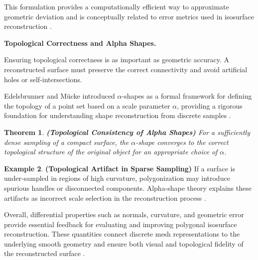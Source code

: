 \documentclass[12pt, a4paper, oneside]{book}
\theoremstyle{plain}
\newtheorem{theorem}{Theorem}[chapter]
\theoremstyle{definition}
\newtheorem{example}[theorem]{Example}
\theoremstyle{remark}
\theoremstyle{definition}
\begin{document}
This formulation provides a computationally efficient way to approximate geometric deviation and is conceptually related to error metrics used in isosurface reconstruction \cite{garland1997surface}.

\vspace{0.5em}

\textbf{Topological Correctness and Alpha Shapes.}

Ensuring topological correctness is as important as geometric accuracy. A reconstructed surface must preserve the correct connectivity and avoid artificial holes or self-intersections.

Edelsbrunner and Mücke introduced $\alpha$-shapes as a formal framework for defining the topology of a point set based on a scale parameter $\alpha$, providing a rigorous foundation for understanding shape reconstruction from discrete samples \cite{edelsbrunner1994three}.

\begin{theorem}
    \textbf{(Topological Consistency of Alpha Shapes)}
For a sufficiently dense sampling of a compact surface, the $\alpha$-shape converges to the correct topological structure of the original object for an appropriate choice of $\alpha$.
\end{theorem}

\vspace{0.5em}

\begin{example}
    \textbf{(Topological Artifact in Sparse Sampling)}
If a surface is under-sampled in regions of high curvature, polygonization may introduce spurious handles or disconnected components. Alpha-shape theory explains these artifacts as incorrect scale selection in the reconstruction process \cite{edelsbrunner1994three}.
\end{example}


\vspace{0.5em}

Overall, differential properties such as normals, curvature, and geometric error provide essential feedback for evaluating and improving polygonal isosurface reconstruction. These quantities connect discrete mesh representations to the underlying smooth geometry and ensure both visual and topological fidelity of the reconstructed surface \cite{rusinkiewicz2004estimating,taubin1995curvature,cignoni1998metro,garland1997quadric,edelsbrunner1994three}.

%
% 
%

\newpage


\end{document}
